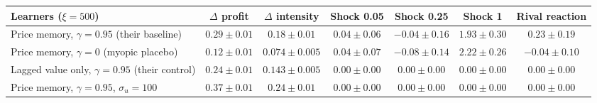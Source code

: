 \begin{tabular}{lcccccc}
\toprule
Learners ($\xi=500$) & $\Delta$ profit & $\Delta$ intensity & Shock 0.05 & Shock 0.25 & Shock 1 & Rival reaction \\
\midrule
Price memory, $\gamma=0.95$ (their baseline) & $0.29 \pm 0.01$ & $0.18 \pm 0.01$ & $0.04 \pm 0.06$ & $-0.04 \pm 0.16$ & $1.93 \pm 0.30$ & $0.23 \pm 0.19$ \\
Price memory, $\gamma=0$ (myopic placebo) & $0.12 \pm 0.01$ & $0.074 \pm 0.005$ & $0.04 \pm 0.07$ & $-0.08 \pm 0.14$ & $2.22 \pm 0.26$ & $-0.04 \pm 0.10$ \\
Lagged value only, $\gamma=0.95$ (their control) & $0.24 \pm 0.01$ & $0.143 \pm 0.005$ & $0.00 \pm 0.00$ & $0.00 \pm 0.00$ & $0.00 \pm 0.00$ & $0.00 \pm 0.00$ \\
Price memory, $\gamma=0.95$, $\sigma_u=100$ & $0.37 \pm 0.01$ & $0.24 \pm 0.01$ & $0.00 \pm 0.00$ & $0.00 \pm 0.00$ & $0.00 \pm 0.00$ & $0.00 \pm 0.00$ \\
\bottomrule
\end{tabular}